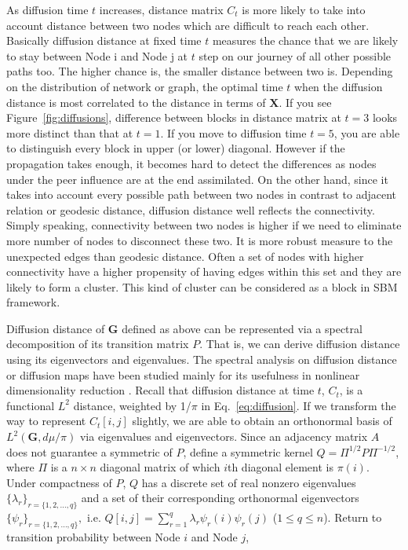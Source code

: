 \documentclass[12pt]{article}
\theoremstyle{definition}
\begin{document}
As diffusion time $t$ increases, distance matrix $C_{t}$ is more likely to take into account distance between two nodes which are difficult to reach each other. Basically diffusion distance at fixed time $t$ measures the chance that we are likely to stay between Node i and Node j at $t$ step on our journey of all other possible paths too. The higher chance is, the smaller distance between two is. Depending on the distribution of network or graph, the optimal time $t$ when the diffusion distance is most correlated to the distance in terms of $\mathbf{X}$. If you see Figure~\ref{fig:diffusions}, difference between blocks in distance matrix at $t=3$ looks more distinct than that at $t=1$.  If you move to diffusion time $t=5$, you are able to distinguish every block in upper (or lower) diagonal. However if the propagation takes enough, it becomes hard to detect the differences as nodes under the peer influence are at the end assimilated. On the other hand, since it takes into account every possible path between two nodes in contrast to adjacent relation or geodesic distance, diffusion distance well reflects the connectivity. Simply speaking, connectivity between two nodes is higher if we need to eliminate more number of nodes to disconnect these two. It is more robust measure to the unexpected edges than geodesic distance. Often a set of nodes with higher connectivity have a higher propensity of having edges within this set and they are likely to form a cluster. This kind of cluster can be considered as a block in SBM framework. 
	
Diffusion distance of $\mathbf{G}$ defined as above can be represented via a spectral decomposition of its transition matrix $P$. That is, we can derive diffusion distance using its eigenvectors and eigenvalues. The spectral analysis on diffusion distance or diffusion maps have been studied mainly for its usefulness in nonlinear dimensionality reduction \citep{coifman2006diffusion,lafon2006diffusion}. 
Recall that diffusion distance at time $t$, $C_{t}$, is a functional $L^2$ distance, weighted by 1/$\pi$ in Eq.~\ref{eq:diffusion}. If we transform the way to represent $C_{t}[i,j]$ slightly, we are able to obtain an orthonormal basis of $L^{2}(\mathbf{G}, d\mu / \pi)$ via eigenvalues and eigenvectors. 
Since an adjacency matrix $A$ does not guarantee a symmetric of $P$, define a symmetric kernel $Q = \Pi^{1/2} P \Pi^{-1/2}$, where $\Pi$ is a $n \times n$ diagonal matrix of which $i$th diagonal element is $\pi(i)$. Under compactness of $P$, $Q$ has a discrete set of real nonzero eigenvalues $\{ \lambda_{r} \}_{r = \{1,2,...,q \}}$ and a set of their corresponding orthonormal eigenvectors $\{ \psi_{r} \}_{r = \{1,2,..., q \} },$ i.e. $Q[i,j] = \sum\limits_{r=1}^{q} \lambda_{r} \psi_{r}(i) \psi_{r}(j)$ ($1 \leq q \leq n$).  Return to transition probability between Node $i$ and Node $j$,
\end{document}
